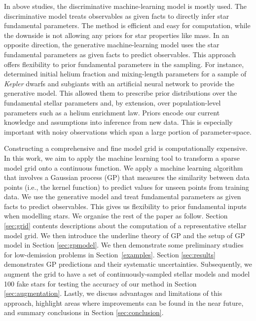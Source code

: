 In above studies, the discriminative machine-learning model is mostly used. The discriminative model treats observables as given facts to directly infer star fundamental parameters. The method is efficient and easy for computation, while the downside is not allowing any priors for star properties like mass.
%
In an opposite direction, the generative machine-learning model uses the star fundamental parameters as given facts to predict observables. This approach offers flexibility to prior fundamental parameters in the sampling. For instance,  \citet{2021MNRAS.tmp.1343L}  determined initial helium fraction and mixing-length parameters for a sample of {\em Kepler} dwarfs and subgiants with an artificial neural network to provide the generative model. This allowed them to prescribe prior distributions over the fundamental stellar parameters and, by extension, over population-level parameters such as a helium enrichment law. Priors encode our current knowledge and assumptions into inference from new data. This is especially important with noisy observations which span a large portion of parameter-space.


Constructing a comprehensive and fine model grid is computationally expensive. In this work, we aim to apply the machine learning tool to transform a sparse model grid onto a continuous function. We apply a machine learning algorithm that involves a Gaussian process (GP) that measures the similarity between data points (i.e., the kernel function) to predict values for unseen points from training data. We use the generative model and treat fundamental parameters as given facts to predict observables. This gives us flexibility to prior fundamental inputs when modelling stars. We organise the rest of the paper as follow. Section \ref{sec:grid} contents descriptions about the computation of a representative stellar model grid. We then introduce the underline theory of GP and the setup of GP model in Section \ref{sec:gpmodel}. We then demonstrate some preliminary studies for low-demission problems in Section~\ref{examples}. Section \ref{sec:results} demonstrates GP predictions and their systematic uncertainties. Subsequently, we augment the grid to have a set of continuously-sampled stellar models and model 100 fake stars for testing the accuracy of our method in Section \ref{sec:augmentation}. Lastly, we discuss advantages and limitations of this approach, highlight areas where improvements can be found in the near future, and summary conclusions in Section \ref{sec:conclusion}.


